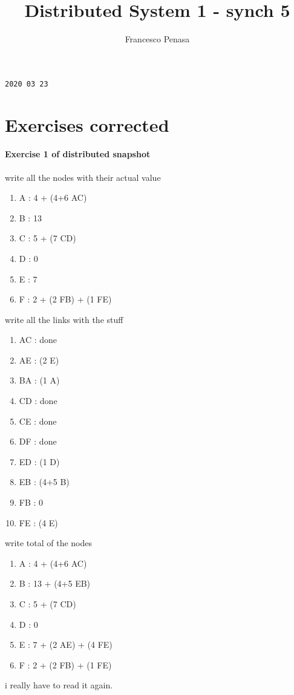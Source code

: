 \documentclass[11pt]{article}
\begin{document}
\author{Francesco Penasa}
\title{Distributed System 1 - synch 5}
\maketitle

\medskip

\texttt{2020 03 23}

\section{Exercises corrected} %
\label{sec:exercises_corrected}
\paragraph{Exercise 1 of distributed snapshot}
\label{par:exercise_1_of_distributed_snapshot}
write all the nodes with their actual value
\begin{enumerate}
	\item A : 4 + (4+6 AC) 
	\item B : 13
	\item C : 5 + (7 CD)
	\item D : 0
	\item E : 7
	\item F : 2 + (2 FB) + (1 FE)
\end{enumerate}
write all the links with the stuff
\begin{enumerate}
	\item AC : done
	\item AE : (2 E)
	\item BA : (1 A)
	\item CD : done
	\item CE : done
	\item DF : done
	\item ED : (1 D)
	\item EB : (4+5 B)
	\item FB : 0
	\item FE : (4 E)
\end{enumerate}
write total of the nodes
\begin{enumerate}
	\item A : 4 + (4+6 AC) 
	\item B : 13 + (4+5 EB)
	\item C : 5 + (7 CD)
	\item D : 0
	\item E : 7 + (2 AE) + (4 FE)
	\item F : 2 + (2 FB) + (1 FE)
\end{enumerate}
i really have to read it again.
\end{document}
